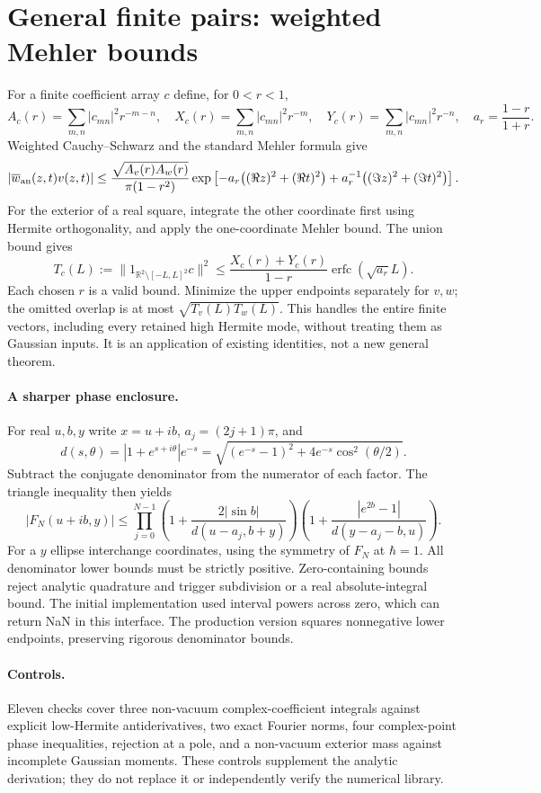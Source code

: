 \documentclass[11pt,a4paper]{article}
\newcommand{\R}{\mathbb R}
\begin{document}
\newpage
\section{General finite pairs: weighted Mehler bounds}
For a finite coefficient array $c$ define, for $0<r<1$,
\[
 A_c(r)=\sum_{m,n}|c_{mn}|^2r^{-m-n},\quad
 X_c(r)=\sum_{m,n}|c_{mn}|^2r^{-m},\quad
 Y_c(r)=\sum_{m,n}|c_{mn}|^2r^{-n},\quad a_r=\frac{1-r}{1+r}.
\]
Weighted Cauchy--Schwarz and the standard Mehler formula give
\[
 |\overline{w}_{\rm an}(z,t)v(z,t)|\le
 \frac{\sqrt{A_v(r)A_w(r)}}{\pi(1-r^2)}
 \exp\left[-a_r\big((\Re z)^2+(\Re t)^2\big)
       +a_r^{-1}\big((\Im z)^2+(\Im t)^2\big)\right].
\]
For the exterior of a real square, integrate the other coordinate
first using Hermite orthogonality, and apply the one-coordinate
Mehler bound. The union bound gives
\[
 T_c(L):=\|1_{\R^2\setminus[-L,L]^2}c\|^2
 \le\frac{X_c(r)+Y_c(r)}{1-r}\operatorname{erfc}(\sqrt{a_r}L).
\]
Each chosen $r$ is a valid bound. Minimize the upper endpoints
separately for $v,w$; the omitted overlap is at most
$\sqrt{T_v(L)T_w(L)}$. This handles the entire finite vectors,
including every retained high Hermite mode, without treating them
as Gaussian inputs. It is an application of existing identities,
not a new general theorem.

\paragraph{A sharper phase enclosure.}
For real $u,b,y$ write $x=u+ib$, $a_j=(2j+1)\pi$, and
\[
 d(s,\theta)=|1+e^{s+i\theta}|e^{-s}
 =\sqrt{(e^{-s}-1)^2+4e^{-s}\cos^2(\theta/2)}.
\]
Subtract the conjugate denominator from the numerator of each
factor. The triangle inequality then yields
\[
 |F_N(u+ib,y)|\le\prod_{j=0}^{N-1}
 \left(1+\frac{2|\sin b|}{d(u-a_j,b+y)}\right)
 \left(1+\frac{|e^{2b}-1|}{d(y-a_j-b,u)}\right).
\]
For a $y$ ellipse interchange coordinates, using the symmetry of
$F_N$ at $\hbar=1$. All denominator lower bounds must be strictly
positive. Zero-containing bounds reject analytic quadrature and
trigger subdivision or a real absolute-integral bound.
The initial implementation used interval powers across zero, which
can return NaN in this interface. The production version squares
nonnegative lower endpoints, preserving rigorous denominator bounds.

\paragraph{Controls.}
Eleven checks cover three non-vacuum complex-coefficient integrals
against explicit low-Hermite antiderivatives, two exact Fourier norms,
four complex-point phase inequalities, rejection at a pole, and a
non-vacuum exterior mass against incomplete Gaussian moments.
These controls supplement the analytic derivation; they do not
replace it or independently verify the numerical library.
\end{document}
